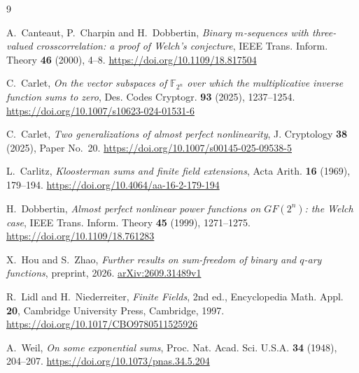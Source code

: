 \documentclass[11pt]{amsart}
\theoremstyle{definition}
\theoremstyle{remark}
\numberwithin{equation}{section}
\newcommand{\F}{\mathbb{F}}
\providecommand{\doi}[1]{\url{https://doi.org/#1}}
\begin{document}
\begin{thebibliography}{9}

A.~Canteaut, P.~Charpin and H.~Dobbertin, \emph{Binary $m$-sequences with three-valued crosscorrelation: a proof of Welch's conjecture}, IEEE Trans. Inform. Theory \textbf{46} (2000), 4--8. \doi{10.1109/18.817504}

C.~Carlet, \emph{On the vector subspaces of $\F_{2^n}$ over which the multiplicative inverse function sums to zero}, Des. Codes Cryptogr. \textbf{93} (2025), 1237--1254. \doi{10.1007/s10623-024-01531-6}

C.~Carlet, \emph{Two generalizations of almost perfect nonlinearity}, J. Cryptology \textbf{38} (2025), Paper No.~20. \doi{10.1007/s00145-025-09538-5}

L.~Carlitz, \emph{Kloosterman sums and finite field extensions}, Acta Arith. \textbf{16} (1969), 179--194. \doi{10.4064/aa-16-2-179-194}

H.~Dobbertin, \emph{Almost perfect nonlinear power functions on $GF(2^n)$: the Welch case}, IEEE Trans. Inform. Theory \textbf{45} (1999), 1271--1275. \doi{10.1109/18.761283}

X.~Hou and S.~Zhao, \emph{Further results on sum-freedom of binary and $q$-ary functions}, preprint, 2026. \href{https://arxiv.org/abs/2609.31489v1}{arXiv:2609.31489v1}

R.~Lidl and H.~Niederreiter, \emph{Finite Fields}, 2nd ed., Encyclopedia Math. Appl. \textbf{20}, Cambridge University Press, Cambridge, 1997. \doi{10.1017/CBO9780511525926}

A.~Weil, \emph{On some exponential sums}, Proc. Nat. Acad. Sci. U.S.A. \textbf{34} (1948), 204--207. \doi{10.1073/pnas.34.5.204}

\end{thebibliography}
\end{document}
